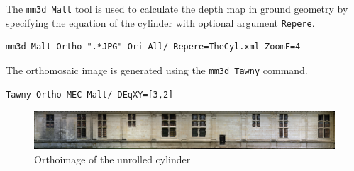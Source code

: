 The {\tt mm3d Malt} tool is used to calculate the depth map in ground geometry by specifying the equation of the cylinder with optional argument {\tt Repere}.

\begin{verbatim}
mm3d Malt Ortho ".*JPG" Ori-All/ Repere=TheCyl.xml ZoomF=4
\end{verbatim}

The orthomosaic image is generated using the {\tt mm3d Tawny} command.

\begin{verbatim}
Tawny Ortho-MEC-Malt/ DEqXY=[3,2]
\end{verbatim}


\begin{figure}[H]
    \begin{center}
    \setlength{\unitlength}{0.5cm}
    \includegraphics[width=\linewidth]{FIGS/ChambordTower/ortho_chambord_tower.png}
    \end{center}
    \caption{Orthoimage of the unrolled cylinder}
    \label{fig:ortho}
\end{figure}












